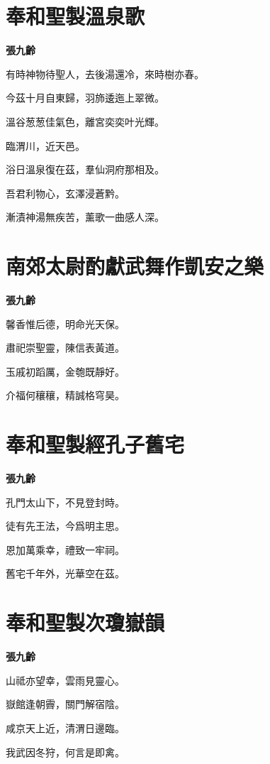 \documentclass[12pt,a4paper]{ctexbook}
\begin{document}
\section{奉和聖製溫泉歌}
\textbf{張九齡}\par\vspace{0.5em}
有時神物待聖人，去後湯還冷，來時樹亦春。\par
今茲十月自東歸，羽斾逶迤上翠微。\par
溫谷葱葱佳氣色，離宮奕奕叶光輝。\par
臨渭川，近天邑。\par
浴日溫泉復在茲，羣仙洞府那相及。\par
吾君利物心，玄澤浸蒼黔。\par
漸漬神湯無疾苦，薰歌一曲感人深。\par

\section{南郊太尉酌獻武舞作凱安之樂}
\textbf{張九齡}\par\vspace{0.5em}
馨香惟后德，明命光天保。\par
肅祀崇聖靈，陳信表黃道。\par
玉戚初蹈厲，金匏既靜好。\par
介福何穰穰，精誠格穹昊。\par

\section{奉和聖製經孔子舊宅}
\textbf{張九齡}\par\vspace{0.5em}
孔門太山下，不見登封時。\par
徒有先王法，今爲明主思。\par
恩加萬乘幸，禮致一牢祠。\par
舊宅千年外，光華空在茲。\par

\section{奉和聖製次瓊嶽韻}
\textbf{張九齡}\par\vspace{0.5em}
山祗亦望幸，雲雨見靈心。\par
嶽館逢朝霽，關門解宿陰。\par
咸京天上近，清渭日邊臨。\par
我武因冬狩，何言是即禽。\par
\end{document}
